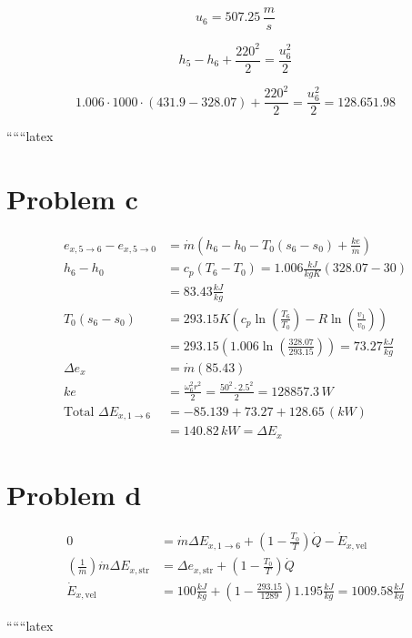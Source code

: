 \[ u_6 = 507.25 \, \frac{m}{s} \]

\[ h_5 - h_6 + \frac{220^2}{2} = \frac{u_6^2}{2} \]

\[ 1.006 \cdot 1000 \cdot (431.9 - 328.07) + \frac{220^2}{2} = \frac{u_6^2}{2} = 128.651.98 \]

``````latex


\section*{Problem c}

\begin{align*}
e_{x,5\rightarrow 6} - e_{x,5\rightarrow 0} &= \dot{m} \left( h_6 - h_0 - T_0 (s_6 - s_0) + \frac{ke}{\dot{m}} \right) \\
h_6 - h_0 &= c_p (T_6 - T_0) = 1.006 \frac{kJ}{kgK} (328.07 - 30) \\
&= 83.43 \frac{kJ}{kg} \\
T_0 (s_6 - s_0) &= 293.15 K \left( c_p \ln \left( \frac{T_6}{T_0} \right) - R \ln \left( \frac{v_1}{v_0} \right) \right) \\
&= 293.15 \left( 1.006 \ln \left( \frac{328.07}{293.15} \right) \right) = 73.27 \frac{kJ}{kg} \\
\Delta e_x &= \dot{m} (85.43) \\
ke &= \frac{\omega_6^2 r^2}{2} = \frac{50^2 \cdot 2.5^2}{2} = 128857.3 \, W \\
\text{Total } \Delta E_{x,1\rightarrow 6} &= -85.139 + 73.27 + 128.65 \, (kW) \\
&= 140.82 \, kW = \Delta E_x
\end{align*}

\section*{Problem d}


\begin{align*}
0 &= \dot{m} \Delta E_{x,1\rightarrow 6} + \left( 1 - \frac{T_0}{T} \right) \dot{Q} - \dot{E}_{x,\text{vel}} \\
\left( \frac{1}{\dot{m}} \right) \dot{m} \Delta E_{x,\text{str}} &= \Delta e_{x,\text{str}} + \left( 1 - \frac{T_0}{T} \right) \dot{Q} \\
\dot{E}_{x,\text{vel}} &= 100 \frac{kJ}{kg} + \left( 1 - \frac{293.15}{1289} \right) 1.195 \frac{kJ}{kg} = 1009.58 \frac{kJ}{kg}
\end{align*}


``````latex


